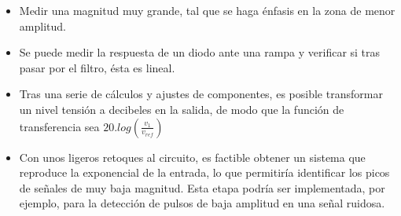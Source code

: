 \begin{itemize}
\item Medir una magnitud muy grande, tal que se haga énfasis en la zona de menor amplitud.


\item Se puede medir la respuesta de un diodo ante una rampa y verificar si tras pasar por el filtro, ésta es lineal.

\item Tras una serie de cálculos y ajustes de componentes, es posible transformar un nivel tensión a decibeles en la salida, de modo que la función de transferencia sea $20.log(\frac{v_1}{v_{ref}})$

\item Con unos ligeros retoques al circuito, es factible obtener un sistema que reproduce la exponencial de la entrada, lo que permitiría identificar los picos de señales de muy baja magnitud. Esta etapa podría ser implementada, por ejemplo, para la detección de pulsos de baja amplitud en una señal ruidosa.
\end{itemize}







